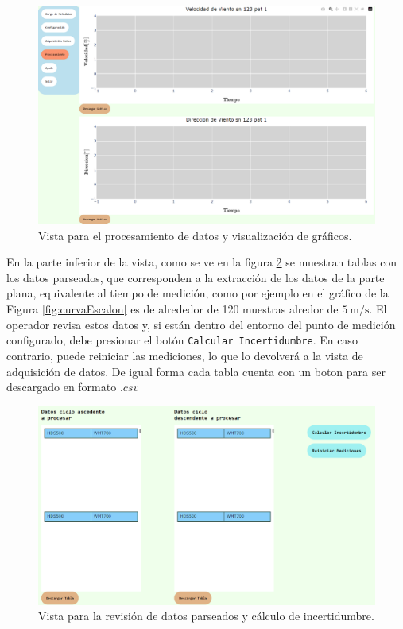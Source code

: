 \begin{figure}[H]
    \centering
    \includegraphics[width=1.1\linewidth]{Figuras/AplicacionWeb/frondend/procesarDatos1.png}
    \caption{Vista para el procesamiento de datos y visualización de gráficos.}
    \label{fig:procesarDatos1}
\end{figure}

En la parte inferior de la vista, como se ve en la figura \ref{fig:procesarDatos2} se muestran tablas con los datos parseados, que corresponden a la extracción de los datos de la parte plana, equivalente al tiempo de medición, como por ejemplo en el gráfico de la Figura \ref{fig:curvaEscalon} es de alrededor de 120 muestras alredor de $\SI{5}{\meter\per\second}$. El operador revisa estos datos y, si están dentro del entorno del punto de medición configurado, debe presionar el botón \texttt{Calcular Incertidumbre}. En caso contrario, puede reiniciar las mediciones, lo que lo devolverá a la vista de adquisición de datos. De igual forma cada tabla cuenta con un boton para ser descargado en formato $.csv$

\begin{figure}[H]
    \centering
    \includegraphics[width=0.9\linewidth]{Figuras/AplicacionWeb/frondend/procesarDatos2.png}
    \caption{Vista para la revisión de datos parseados y cálculo de incertidumbre.}
    \label{fig:procesarDatos2}
\end{figure}



